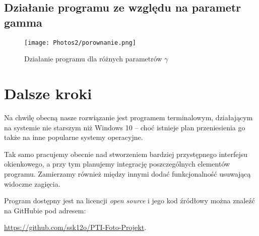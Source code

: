 \documentclass[]{mwart}
\begin{document}
\newpage
\subsection{Działanie programu ze względu na parametr gamma}
\begin{figure}[H]
    \centering
    \texttt{[image: Photos2/porownanie.png]}
    \caption{Działanie programu dla różnych parametrów $\gamma$}
\end{figure}


\section{Dalsze kroki}
Na chwilę obecną nasze rozwiązanie jest programem terminalowym,
działającym na systemie nie starszym niż Windows 10 -- choć istnieje
plan przeniesienia go także na inne popularne systemy operacyjne.

Tak samo pracujemy obecnie nad stworzeniem bardziej przystępnego interfejsu okienkowego, a przy tym
planujemy integrację poszczególnych elementów programu. Zamierzamy również między innymi dodać funkcjonalność usuwającą widoczne zagięcia.

Program dostępny jest na licencji \textit{open source} i jego kod źródłowy można znaleźć na GitHubie
pod adresem:
\begin{center}
    \url{https://github.com/ssk12o/PTI-Foto-Projekt}.
\end{center}




\newpage
\end{document}
